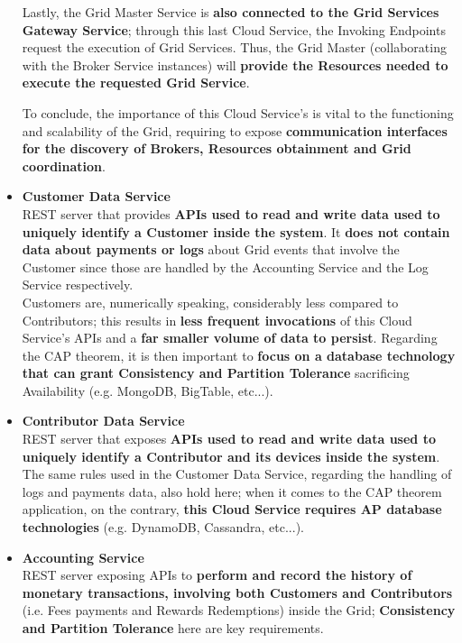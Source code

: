 \begin{itemize}
    Lastly, the Grid Master Service is \textbf{also connected to the Grid Services Gateway Service}; through this last Cloud Service, the Invoking Endpoints request the execution of Grid Services. Thus, the Grid Master (collaborating with the Broker Service instances) will \textbf{provide the Resources needed to execute the requested Grid Service}.

    To conclude, the importance of this Cloud Service's is vital to the functioning and scalability of the Grid, requiring to expose \textbf{communication interfaces for the discovery of Brokers, Resources obtainment and Grid coordination}.

    \item \textbf{Customer Data Service}\\
    REST server that provides \textbf{APIs used to read and write data used to uniquely identify a Customer inside the system}. It \textbf{does not contain data about payments or logs} about Grid events that involve the Customer since those are handled by the Accounting Service and the Log Service respectively.\\
    Customers are, numerically speaking, considerably less compared to Contributors; this results in \textbf{less frequent invocations} of this Cloud Service's APIs and a \textbf{far smaller volume of data to persist}. Regarding the CAP theorem, it is then important to \textbf{focus on a database technology that can grant Consistency and Partition Tolerance} sacrificing Availability (e.g. MongoDB, BigTable, etc...).

    \item \textbf{Contributor Data Service}\\
    REST server that exposes \textbf{APIs used to read and write data used to uniquely identify a Contributor and its devices inside the system}. The same rules used in the Customer Data Service, regarding the handling of logs and payments data, also hold here; when it comes to the CAP theorem application, on the contrary, \textbf{this Cloud Service requires AP database technologies} (e.g. DynamoDB, Cassandra, etc...).

    \item \textbf{Accounting Service}\\
    REST server exposing APIs to \textbf{perform and record the history of monetary transactions, involving both Customers and Contributors} (i.e. Fees payments and Rewards Redemptions) inside the Grid; \textbf{Consistency and Partition Tolerance} here are key requirements.


\end{itemize}
